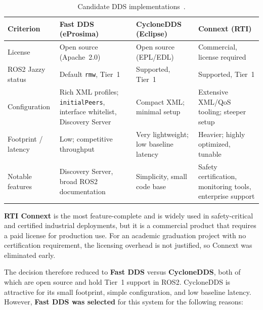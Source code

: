 \begin{table}[htbp]
    \centering
    \caption{Candidate DDS implementations~\cite{eprosima_fastdds,eclipse_cyclonedds,rti_connext,kronauer2021latency}.}
    \label{tab:dds_vendor_comparison}
    \begin{tabular}{p{} p{} p{} p{}}
        \toprule
        \textbf{Criterion} & \textbf{Fast DDS (eProsima)} & \textbf{CycloneDDS (Eclipse)} & \textbf{Connext (RTI)} \\
        \midrule
        License & Open source (Apache~2.0) & Open source (EPL/EDL) & Commercial, license required \\
        \addlinespace
        ROS2 Jazzy status & Default \texttt{rmw}, Tier~1 & Supported, Tier~1 & Supported, Tier~1 \\
        \addlinespace
        Configuration & Rich XML profiles; \texttt{initialPeers}, interface whitelist, Discovery Server & Compact XML; minimal setup & Extensive XML/QoS tooling; steeper setup \\
        \addlinespace
        Footprint / latency & Low; competitive throughput & Very lightweight; low baseline latency & Heavier; highly optimized, tunable \\
        \addlinespace
        Notable features & Discovery Server, broad ROS2 documentation & Simplicity, small code base & Safety certification, monitoring tools, enterprise support \\
        \bottomrule
    \end{tabular}
\end{table}

\textbf{RTI Connext} is the most feature-complete and is widely used in safety-critical and certified industrial deployments, but it is a commercial product that requires a paid license for production use. For an academic graduation project with no certification requirement, the licensing overhead is not justified, so Connext was eliminated early.

The decision therefore reduced to \textbf{Fast DDS} versus \textbf{CycloneDDS}, both of which are open source and hold Tier~1 support in ROS2. CycloneDDS is attractive for its small footprint, simple configuration, and low baseline latency. However, \textbf{Fast DDS was selected} for this system for the following reasons:

